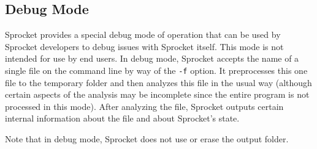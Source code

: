 \subsection{Debug Mode}

Sprocket provides a special debug mode of operation that can be used by Sprocket developers to
debug issues with Sprocket itself. This mode is not intended for use by end users. In debug
mode, Sprocket accepts the name of a single file on the command line by way of the \texttt{-f}
option. It preprocesses this one file to the temporary folder and then analyzes this file in the
usual way (although certain aspects of the analysis may be incomplete since the entire program
is not processed in this mode). After analyzing the file, Sprocket outputs certain internal
information about the file and about Sprocket's state.

Note that in debug mode, Sprocket does not use or erase the output folder.


